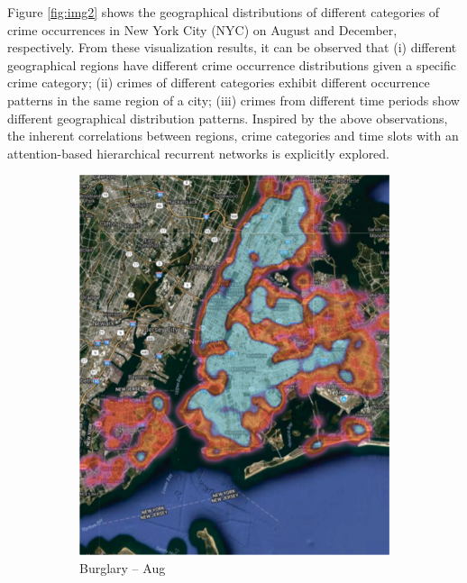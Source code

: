 Figure \ref{fig:img2} shows the geographical distributions of different categories of crime occurrences in New York City (NYC) on August
and December, respectively. From these visualization results, it
can be observed that (i) different geographical regions have different
crime occurrence distributions given a specific crime category; (ii)
crimes of different categories exhibit different occurrence patterns
in the same region of a city; (iii) crimes from different time periods
show different geographical distribution patterns. Inspired by the
above observations, the inherent correlations between regions, crime categories and time slots with an attention-based hierarchical recurrent networks is explicitly explored.
\begin{figure}[t]
    \captionsetup[subfigure]{font=scriptsize,labelfont=scriptsize}
    \centering
    \begin{subfigure}{0.24\textwidth}
        \centering
        \includegraphics[width=0.9\linewidth]{Chapter5/Images/burglary.png} 
        \caption{Burglary – Aug}
        \label{fig:subim1}
    \end{subfigure}
    \begin{subfigure}{0.24\textwidth}
        \centering

\end{subfigure}
\end{figure}
